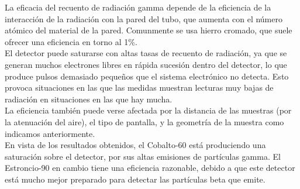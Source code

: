 \documentclass[a4paper,12pt,spanish]{article}
\begin{document}
	La eficacia del recuento de radiación gamma depende de la eficiencia de la interacción de la radiación con la pared del tubo, que aumenta con el número atómico del material de la pared. Comunmente se usa hierro cromado, que suele ofrecer una eficiencia en torno al 1\%.\\
	
	El detector puede saturarse con altas tasas de recuento de radiación, ya que se generan muchos electrones libres en rápida sucesión dentro del detector, lo que produce pulsos demasiado pequeños que el sistema electrónico no detecta. Esto provoca situaciones en las que las medidas muestran lecturas muy bajas de radiación en situaciones en las que hay mucha.\\
	
	La eficiencia también puede verse afectada por la distancia de las muestras (por la atenuación del aire), el tipo de pantalla, y la geometría de la muestra como indicamos anteriormente.\\
	
	En vista de los resultados obtenidos, el Cobalto-60 está produciendo una saturación sobre el detector, por sus altas emisiones de partículas gamma.  El Estroncio-90 en cambio tiene una eficiencia razonable, debido a que este detector está mucho mejor preparado para detectar las partículas beta que emite.
	
	
	
	
	
\end{document}
